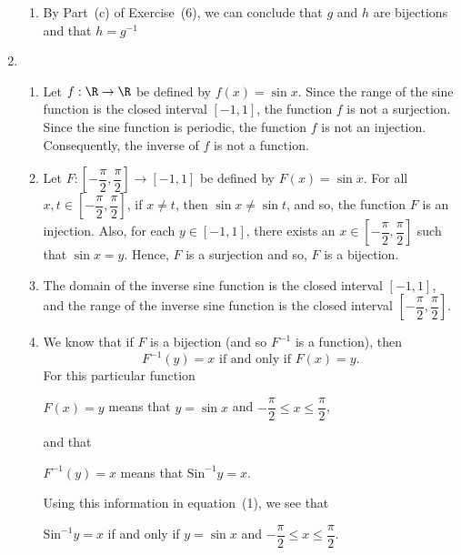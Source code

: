 \begin{enumerate}
\begin{enumerate}
\item By Part~(c) of Exercise~(6), we can conclude that $g$ and $h$ are bijections and that $h = g^{-1}$
\end{enumerate}



\item \begin{enumerate}
\item Let $f: \R \to \R$ be defined by $f(x) = \sin x$.  Since the range of the sine function is the closed interval $[-1, 1]$, the function $f$ is not a surjection.  Since the sine function is periodic, the function $f$ is not an injection.  Consequently, the inverse of $f$ is not a function.

\item Let $F:\left[ {- \dfrac{{\pi }}{2}, \dfrac{\pi }{2}} \right] \to \left[ { - 1, 1} \right]$
be defined by $F\left( x \right) = \sin x$.  For all 
$x, t \in \left[ {- \dfrac{{\pi }}{2}, \dfrac{\pi }{2}} \right]$, if $x \ne t$, then 
$\sin x \ne \sin t$, and so, the function $F$ is an injection.  Also, for each 
$y \in [-1, 1]$, there exists an $x \in \left[ {- \dfrac{{\pi }}{2}, \dfrac{\pi }{2}} \right]$ such that $\sin x = y$.  Hence, $F$ is a surjection and so, $F$ is a bijection.

\item The domain of the inverse sine function is the closed interval $[-1, 1]$, and the range of the inverse sine function is the closed interval 
$\left[ {- \dfrac{{\pi }}{2}, \dfrac{\pi }{2}} \right]$.

\item We know that if $F$ is a bijection (and so $F^{-1}$ is a function), then
\begin{equation}
F^{-1}(y) = x \text{ if and only if } F(x) = y.
\end{equation}
For this particular function
\begin{center}
$F(x) = y$ means that $y = \sin x$ and $-\dfrac{\pi}{2} \leq x \leq \dfrac{\pi}{2}$,
\end{center}
and that
\begin{center}
$F^{-1}(y) = x$ means that $\text{Sin}^{-1}y = x$.
\end{center}
Using this information in equation~(1), we see that
\begin{center}
$\text{Sin}^{-1}y = x$ if and only if $y = \sin x$ and 
$-\dfrac{\pi}{2} \leq x \leq \dfrac{\pi}{2}$.
\end{center}
\end{enumerate}

\end{enumerate}

\hbreak

\endinput

